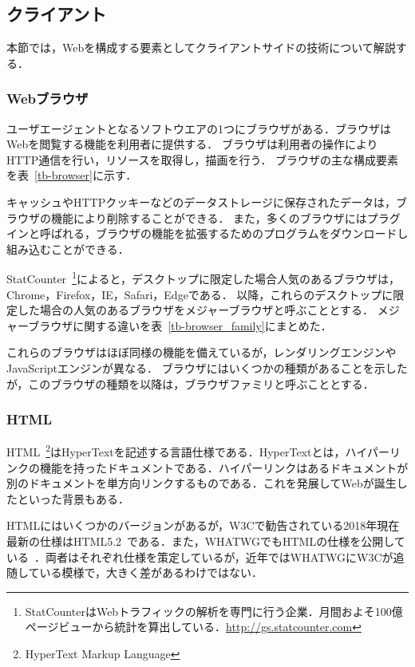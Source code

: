 \subsection{クライアント}
本節では，Webを構成する要素としてクライアントサイドの技術について解説する．
\subsubsection{Webブラウザ}
ユーザエージェントとなるソフトウエアの1つにブラウザがある．ブラウザはWebを閲覧する機能を利用者に提供する．
ブラウザは利用者の操作によりHTTP通信を行い，リソースを取得し，描画を行う．
ブラウザの主な構成要素を表~\ref{tb-browser}に示す．

キャッシュやHTTPクッキーなどのデータストレージに保存されたデータは，ブラウザの機能により削除することができる． 
また，多くのブラウザにはプラグインと呼ばれる，ブラウザの機能を拡張するためのプログラムをダウンロードし組み込むことができる．

StatCounter~\footnote{StatCounterはWebトラフィックの解析を専門に行う企業．月間およそ100億ページビューから統計を算出している．\url{http://gs.statcounter.com}}によると，デスクトップに限定した場合人気のあるブラウザは，Chrome，Firefox，IE，Safari，Edgeである．
以降，これらのデスクトップに限定した場合の人気のあるブラウザをメジャーブラウザと呼ぶこととする．
メジャーブラウザに関する違いを表~\ref{tb-browser_family}にまとめた．

これらのブラウザはほぼ同様の機能を備えているが，レンダリングエンジンやJavaScriptエンジンが異なる．
ブラウザにはいくつかの種類があることを示したが，このブラウザの種類を以降は，ブラウザファミリと呼ぶこととする．
\subsubsection{HTML}
HTML~\footnote{HyperText Markup Language}はHyperTextを記述する言語仕様である．HyperTextとは，ハイパーリンクの機能を持ったドキュメントである．ハイパーリンクはあるドキュメントが別のドキュメントを単方向リンクするものである．これを発展してWebが誕生したといった背景もある．

HTMLにはいくつかのバージョンがあるが，W3Cで勧告されている2018年現在最新の仕様はHTML5.2~\cite{html5_2}である．また，WHATWGでもHTMLの仕様を公開している~\cite{html_ls}．両者はそれぞれ仕様を策定しているが，近年ではWHATWGにW3Cが追随している模様で，大きく差があるわけではない．
